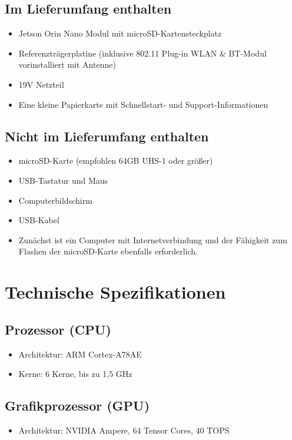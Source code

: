 \documentclass[12pt,a4paper]{report}
\begin{document}
\subsection*{Im Lieferumfang enthalten}

\begin{itemize}
    \item Jetson Orin Nano Modul mit microSD-Kartensteckplatz
    \item Referenzträgerplatine (inklusive 802.11 Plug-in WLAN 
    \& BT-Modul vorinstalliert mit Antenne)
    \item 19V Netzteil
    \item Eine kleine Papierkarte mit Schnellstart- und 
    Support-Informationen
\end{itemize}

\subsection*{Nicht im Lieferumfang enthalten}

\begin{itemize}
    \item microSD-Karte (empfohlen 64GB UHS-1 oder größer)
    \item USB-Tastatur und Maus
    \item Computerbildschirm
    \item USB-Kabel
    \item Zunächst ist ein Computer mit Internetverbindung und der Fähigkeit zum Flashen der microSD-Karte ebenfalls erforderlich.
\end{itemize}
\clearpage

\section{Technische Spezifikationen}
\subsection{Prozessor (CPU)}
\begin{itemize}
    \item Architektur: ARM Cortex-A78AE
    \item Kerne: 6 Kerne, bis zu 1,5 GHz
\end{itemize}

\subsection{Grafikprozessor (GPU)}
\begin{itemize}
    \item Architektur: NVIDIA Ampere, 64 Tensor Cores, 40 TOPS
\end{itemize}
\end{document}
